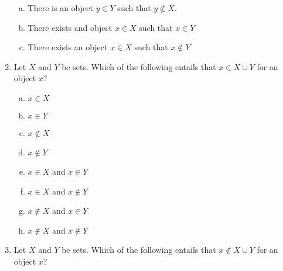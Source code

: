 \begin{enumerate}[\thesection.1]
\begin{enumerate}[(a)]
			\item There is an object $y\in Y$ such that $y\notin X$.
			
			\item There exists and object $x\in X$ such that $x\in Y$
			
			\item There exists an object $x\in X$ such that $x\notin Y$	
					
		\end{enumerate}

		\item Let $X$ and $Y$ be sets. Which of the following entails that $x\in X\cup Y$ for an object $x$?
		
		\begin{minipage}{.5\linewidth}
			\begin{enumerate}[(a)]
		
			\item $x\in X$
			
			\item $x\in Y$			
			
			\item $x\notin X$
			
			\item $x\notin Y$
		\end{enumerate}
		\end{minipage}
		\begin{minipage}{.5\linewidth}
		\begin{enumerate}[(a)]
		\setcounter{enumii}{4}
			
			\item $x\in X$ and $x\in Y$
		
			\item $x\in X$ and $x\notin Y$
			
			\item $x\notin X$ and $x\in Y$
			
			\item $x\notin X$ and $x\notin Y$			
					
		\end{enumerate}
		\end{minipage}
		

		
		\item Let $X$ and $Y$ be sets. Which of the following entails that $x\notin X\cup Y$ for an object $x$?
		
		\begin{minipage}{.5\linewidth}
			\begin{enumerate}[(a)]
		

\end{enumerate}
\end{minipage}
\end{enumerate}
